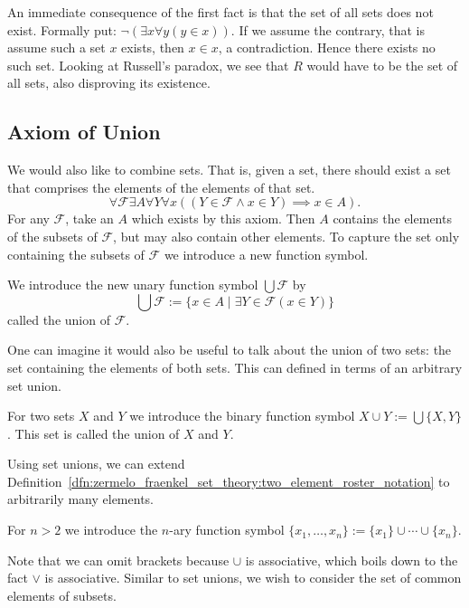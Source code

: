 \documentclass[../main.tex]{subfiles}
\begin{document}
An immediate consequence of the first fact is that the set of all sets does not exist. Formally put: $\lnot(\exists x\forall y(y\in x))$. If we assume the contrary, that is assume such a set $x$ exists, then $x\in x$, a contradiction. Hence there exists no such set. Looking at Russell's paradox, we see that $R$ would have to be the set of all sets, also disproving its existence.

\subsection*{Axiom of Union}\label{subsec:zermelo_fraenkel_set_theory:axiom_of_union}
We would also like to combine sets. That is, given a set, there should exist a set that comprises the elements of the elements of that set.
\begin{equation*}
\forall\mathcal{F}\exists A\forall Y\forall x((Y\in\mathcal{F}\land x\in Y)\implies x\in A).
\end{equation*}
For any $\mathcal{F}$, take an $A$ which exists by this axiom. Then $A$ contains the elements of the subsets of $\mathcal{F}$, but may also contain other elements. To capture the set only containing the subsets of $\mathcal{F}$ we introduce a new function symbol.
\begin{definition}
    We introduce the new unary function symbol $\bigcup\mathcal{F}$ by
    \begin{equation*}
        \bigcup\mathcal{F}:=\{x\in A\mid\exists Y\in\mathcal{F}(x\in Y)\}
    \end{equation*}
    called the union of $\mathcal{F}$.
\end{definition}
One can imagine it would also be useful to talk about the union of two sets: the set containing the elements of both sets. This can defined in terms of an arbitrary set union.
\begin{definition}
    For two sets $X$ and $Y$ we introduce the binary function symbol $X\cup Y:=\bigcup\{X,Y\}$. This set is called the union of $X$ and $Y$.
\end{definition}
Using set unions, we can extend Definition~\ref{dfn:zermelo_fraenkel_set_theory:two_element_roster_notation} to arbitrarily many elements.
\begin{definition}
    For $n>2$ we introduce the $n$-ary function symbol $\{x_1,\dots,x_n\}:=\{x_1\}\cup\cdots\cup\{x_n\}$.
\end{definition}
Note that we can omit brackets because $\cup$ is associative, which boils down to the fact $\lor$ is associative. Similar to set unions, we wish to consider the set of common elements of subsets.
\end{document}
